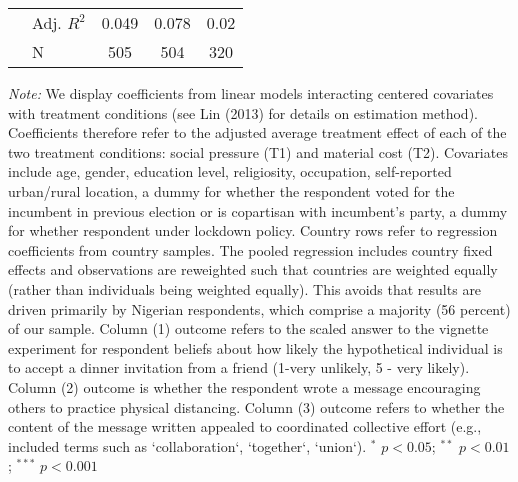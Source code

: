\begin{table}[htb]
\begin{tabular}{llccc}
   & Adj. $R^2$ & 0.049 & 0.078 & 0.02 \\ 
   & N & 505 & 504 & 320 \\ 
   \hline
\end{tabular}
\begin{flushleft}\textit{Note:} We display coefficients from linear models interacting centered covariates with treatment conditions (see Lin (2013) for details on estimation method). Coefficients therefore refer to the adjusted average treatment effect of each of the two treatment conditions: social pressure (T1) and material cost (T2). Covariates include age, gender, education level, religiosity, occupation, self-reported urban/rural location, a dummy for whether the respondent voted for the incumbent in previous election or is copartisan with incumbent's party, a dummy for whether respondent under lockdown policy. Country rows refer to regression coefficients from country samples. The pooled regression includes country fixed effects and observations are reweighted such that countries are weighted equally (rather than individuals being weighted equally). This avoids that results are driven primarily by Nigerian respondents, which comprise a majority (56 percent) of our sample.  Column (1) outcome refers to the scaled answer to the vignette experiment for respondent beliefs about how likely the hypothetical individual is to accept a dinner invitation from a friend (1-very unlikely, 5 - very likely). Column (2) outcome is whether the respondent wrote a message encouraging others to practice physical distancing.  Column (3) outcome refers to whether the content of the message written appealed to coordinated collective effort (e.g., included terms such as `collaboration`, `together`, `union`). $^{*}$ $p<0.05$; $^{**}$ $p<0.01$; $^{***}$ $p<0.001$  \end{flushleft}
\end{table}
